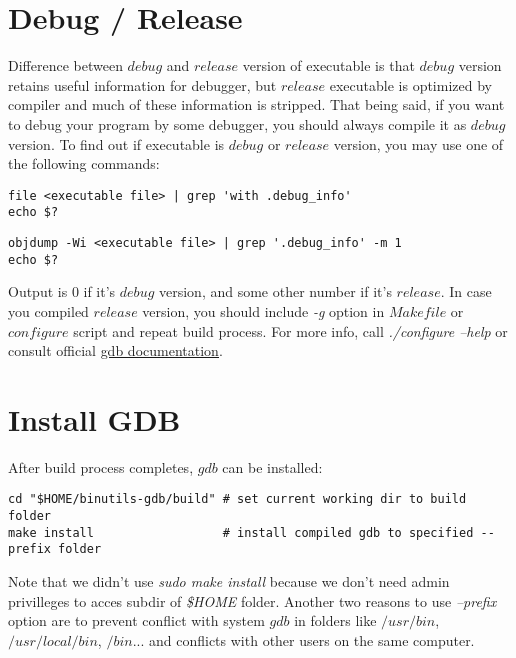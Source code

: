 \documentclass{report}
\begin{document}
\section *{Debug / Release}
Difference between $debug$ and $release$ version of executable is that $debug$ version retains useful information for debugger, but $release$ executable is optimized by compiler and much of these information is stripped. That being said, if you want to debug your program by some debugger, you should always compile it as $debug$ version.
To find out if executable is $debug$ or $release$ version, you may use one of the following commands:
\begin{verbatim}
file <executable file> | grep 'with .debug_info'
echo $?
\end{verbatim}
\begin{verbatim}
objdump -Wi <executable file> | grep '.debug_info' -m 1
echo $?
\end{verbatim}
Output is $0$ if it's $debug$ version, and some other number if it's $release$.
In case you compiled $release$ version, you should include \textit{-g} option in $Makefile$ or $configure$ script and repeat build process. For more info, call \textit{./configure --help} or consult official \href{https://github.com/bminor/binutils-gdb/tree/master/gdb}{\underline{gdb documentation}}.

\section *{Install GDB}
After build process completes, $gdb$ can be installed:
\begin{verbatim}
cd "$HOME/binutils-gdb/build" # set current working dir to build folder
make install                  # install compiled gdb to specified --prefix folder
\end{verbatim}
Note that we didn't use \textit{sudo make install} because we don't need admin privilleges to acces subdir of \textit{\$HOME} folder. Another two reasons to use \textit{--prefix} option are to prevent conflict with system $gdb$ in folders like $/usr/bin$, $/usr/local/bin$, $/bin$... and conflicts with other users on the same computer.
\end{document}
